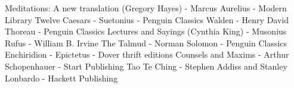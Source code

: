 \begin{thebibliography}{99}

   Meditations: A new translation (Gregory Hayes) - Marcus Aurelius - Modern Library
    Twelve Caesars -  Suetonius - Penguin Classics
     Walden - Henry David Thoreau - Penguin Classics
    Lectures and Sayings (Cynthia King) - Musonius Rufus - William B. Irvine
      The Talmud - Norman Solomon - Penguin Classics
     Enchiridion - Epictetus - Dover thrift editions
    Counsels and Maxims - Arthur Schopenhauer - Start Publishing
   Tao Te Ching - Stephen Addiss and Stanley Lonbardo - Hackett Publishing 

\end{thebibliography}
